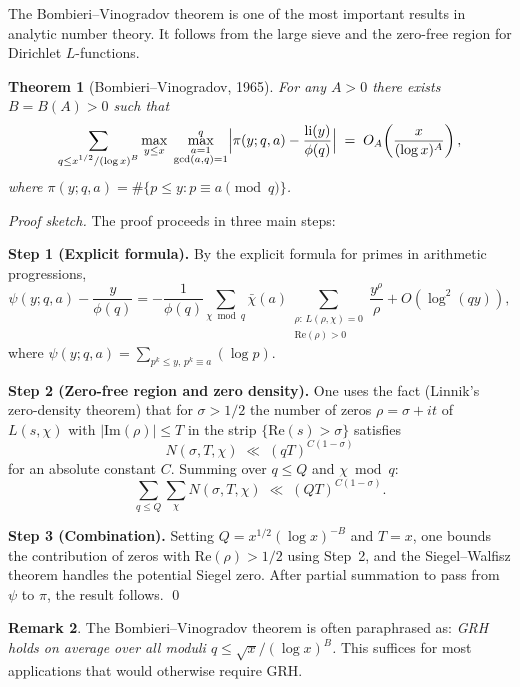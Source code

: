 \documentclass[12pt,a4paper]{amsart}
\newtheorem{theorem}{Theorem}[section]
\theoremstyle{definition}
\newtheorem{remark}[theorem]{Remark}
\DeclareMathOperator{\li}{li}
\begin{document}
The Bombieri--Vinogradov theorem is one of the most important results in
analytic number theory.  It follows from the large sieve and the
zero-free region for Dirichlet $L$-functions.

\begin{theorem}[Bombieri--Vinogradov, 1965]\label{thm:bombieri_vinogradov}
  For any $A > 0$ there exists $B = B(A) > 0$ such that
  \[
    \sum_{\substack{q \leq x^{1/2}/(\log x)^{B}}}
    \max_{y \leq x}\;\max_{\substack{a=1\\\gcd(a,q)=1}}^{q}
    \Bigl|\pi(y;q,a) - \frac{\li(y)}{\phi(q)}\Bigr|
    \;=\;
    O_A\!\left(\frac{x}{(\log x)^{A}}\right),
  \]
  where $\pi(y;q,a) = \#\{p \leq y : p \equiv a \pmod q\}$.
\end{theorem}

\textit{Proof sketch.}
The proof proceeds in three main steps:

\textbf{Step 1 (Explicit formula).}  By the explicit formula for primes
in arithmetic progressions,
\[
  \psi(y;q,a) - \frac{y}{\phi(q)}
  = -\frac{1}{\phi(q)}\sum_{\chi\bmod q}\bar\chi(a)
    \sum_{\substack{\rho:\, L(\rho,\chi)=0\\\text{Re}(\rho)>0}}
    \frac{y^{\rho}}{\rho}
  + O(\log^2(qy)),
\]
where $\psi(y;q,a) = \sum_{p^k \leq y,\, p^k \equiv a}(\log p)$.

\textbf{Step 2 (Zero-free region and zero density).}
One uses the fact (Linnik's zero-density theorem) that for $\sigma > 1/2$
the number of zeros $\rho = \sigma + it$ of $L(s,\chi)$ with
$|\text{Im}(\rho)| \leq T$ in the strip $\{\text{Re}(s) > \sigma\}$
satisfies
\[
  N(\sigma, T, \chi) \;\ll\; (qT)^{C(1-\sigma)}
\]
for an absolute constant $C$.  Summing over $q \leq Q$ and $\chi\bmod q$:
\[
  \sum_{q \leq Q}\sum_\chi N(\sigma,T,\chi)
  \;\ll\; (QT)^{C(1-\sigma)}.
\]

\textbf{Step 3 (Combination).}
Setting $Q = x^{1/2}(\log x)^{-B}$ and $T = x$, one bounds the
contribution of zeros with $\text{Re}(\rho) > 1/2$ using Step~2,
and the Siegel--Walfisz theorem handles the potential Siegel zero.
After partial summation to pass from $\psi$ to $\pi$, the result follows.
\qed

\begin{remark}
  The Bombieri--Vinogradov theorem is often paraphrased as:
  \emph{GRH holds on average over all moduli $q \leq \sqrt{x}/(\log x)^B$.}
  This suffices for most applications that would otherwise require GRH.
\end{remark}

\end{document}
